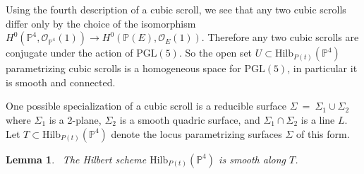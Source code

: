\documentclass[twoside,12pt,reqno]{amsart}
\theoremstyle{plain}
\newtheorem{lem}[thm]{Lemma}
\theoremstyle{definition}
\newcommand{\PP}{\mathbb{P}}
\def\ps{\vspace{4pt}}
\newcommand{\OO}{\mathcal O}
\begin{document}
\ps

Using the fourth description of a cubic scroll, we see that any two
cubic scrolls differ only by the choice of the isomorphism
$H^0(\PP^4,\OO_{\PP^4}(1)) \rightarrow H^0(\PP(E),\OO_{E}(1))$.
Therefore any two cubic scrolls are
conjugate under the action of $\text{PGL}(5)$.  So the open set
$U\subset \text{Hilb}_{P(t)}(\PP^4)$ parametrizing cubic scrolls is a
homogeneous space for 
$\text{PGL}(5)$, in particular it is smooth and connected.

\ps

One possible specialization of a cubic scroll is a reducible surface
$\Sigma ~=~ \Sigma_1\cup \Sigma_2$ where $\Sigma_1$ is a 2-plane,
$\Sigma_2$ is a smooth quadric surface, and $\Sigma_1\cap \Sigma_2$ is
a line $L$.  Let $T\subset \text{Hilb}_{P(t)}(\PP^4)$ denote the locus
parametrizing surfaces $\Sigma$ of this form.  

\ps

\begin{lem}~\label{lem-specsm}  The Hilbert scheme
$\text{Hilb}_{P(t)}(\PP^4)$ is 
smooth along $T$.  
\end{lem}
\end{document}
